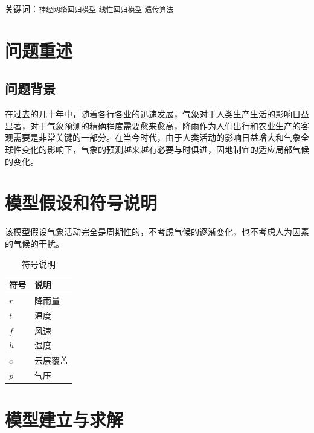 \documentclass[UTF8, a4paper]{ctexart}
\begin{document}
关键词：\texttt{神经网络回归模型}  \texttt{线性回归模型}  \texttt{遗传算法}

\newpage

\section{问题重述}

\subsection{问题背景}

在过去的几十年中，随着各行各业的迅速发展，气象对于人类生产生活的影响日益显著，对于气象预测的精确程度需要愈来愈高，降雨作为人们出行和农业生产的客观需要是非常关键的一部分。在当今时代，由于人类活动的影响日益增大和气象全球性变化的影响下，气象的预测越来越有必要与时俱进，因地制宜的适应局部气候的变化。


\section{模型假设和符号说明}

该模型假设气象活动完全是周期性的，不考虑气候的逐渐变化，也不考虑人为因素的气候的干扰。

\begin{table}[h]
	\centering
	\caption{符号说明}
	\begin{tabular}{p{6em}l}
		\hline
		符号  & 说明     \\
		\hline
		$r$ & 降雨量    \\
		$t$ & 温度 \\
		$f$ & 风速\\
		$h$ & 湿度\\
		$c$ & 云层覆盖\\
		$p$ & 气压\\
		\hline
	\end{tabular}
\end{table}

\section{模型建立与求解}
\end{document}
